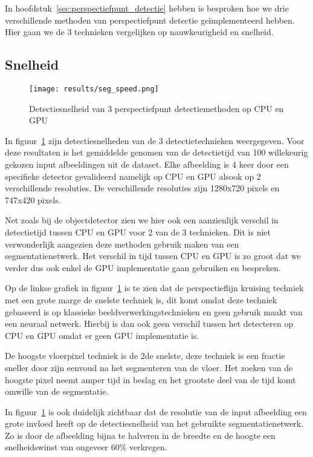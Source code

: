 In hoofdstuk~\ref{sec:perspectiefpunt_detectie} hebben is besproken hoe we drie verschillende methoden van perspectiefpunt detectie ge\"{i}mplementeerd hebben.
Hier gaan we de 3 technieken vergelijken op nauwkeurigheid en snelheid.


\subsection{Snelheid}\label{sec:seg_speed}
\begin{figure}[h]
    \texttt{[image: results/seg\_speed.png]}
    \caption{Detectiesnelheid van 3 perspectiefpunt detectiemethoden op CPU en GPU}
    \label{fig:seg_speed}
\end{figure}

In figuur~\ref{fig:seg_speed} zijn detectiesnelheden van de 3 detectietechnieken weergegeven.
Voor deze resultaten is het gemiddelde genomen van de detectietijd van 100 willekeurig gekozen input afbeeldingen uit de dataset.
Elke afbeelding is 4 keer door een specifieke detector gevalideerd namelijk op \gls{CPU} en \gls{GPU} alsook op 2 verschillende resoluties.
De verschillende resoluties zijn 1280x720 pixels en 747x420 pixels.

Net zoals bij de objectdetector zien we hier ook een aanzienlijk verschil in detectietijd tussen \gls{CPU} en \gls{GPU} voor 2 van de 3 technieken.
Dit is niet verwonderlijk aangezien deze methoden gebruik maken van een segmentatienetwerk.
Het verschil in tijd tussen \gls{CPU} en \gls{GPU} is zo groot dat we verder dus ook enkel de \gls{GPU} implementatie gaan gebruiken en bespreken.

Op de linkse grafiek in figuur~\ref{fig:seg_speed} is te zien dat de perspectieflijn kruising techniek met een grote marge de snelste techniek is, dit komt
omdat deze techniek gebaseerd is op klassieke beeldverwerkingstechnieken en geen gebruik maakt van een neuraal netwerk.
Hierbij is dan ook geen verschil tussen het detecteren op \gls{CPU} en \gls{GPU} omdat er geen \gls{GPU} implementatie is.

De hoogste vloerpixel techniek is de 2de snelste, deze techniek is een fractie sneller door zijn eenvoud na het segmenteren van de vloer.
Het zoeken van de hoogste pixel neemt amper tijd in beslag en het grootste deel van de tijd komt omwille van de segmentatie.

In figuur~\ref{fig:seg_speed} is ook duidelijk zichtbaar dat de resolutie van de input afbeelding een grote invloed heeft op de detectiesnelheid
van het gebruikte segmentatienetwerk.
Zo is door de afbeelding bijna te halveren in de breedte en de hoogte een snelheidswinst van ongeveer $60\%$ verkregen.



